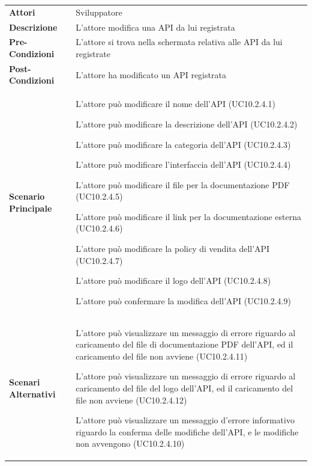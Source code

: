 \begin{minipage}{\linewidth}
	\begin{tabular}{ l | p{11cm}}
		\hline
		\rowcolor{Gray}
		\multicolumn{2}{c}{UC10.2.4 - Modifica API registrata} \\
		\hline
		\textbf{Attori} & Sviluppatore \\
		\textbf{Descrizione} & L'attore modifica una API da lui registrata \\
		\textbf{Pre-Condizioni} & L'attore si trova nella schermata relativa alle API da lui registrate \\
		\textbf{Post-Condizioni} & L'attore ha modificato un API registrata \\
		\textbf{Scenario Principale} & 
		\begin{enumerate*}[label=(\arabic*.),itemjoin={\newline}]
			\item L'attore può modificare il nome dell'API (UC10.2.4.1)
			\item L'attore può modificare la descrizione dell'API (UC10.2.4.2)
			\item L'attore può modificare la categoria dell'API (UC10.2.4.3)
			\item L'attore può modificare l'interfaccia dell'API (UC10.2.4.4)
			\item L'attore può modificare il file per la documentazione PDF (UC10.2.4.5)
			\item L'attore può modificare il link per la documentazione esterna (UC10.2.4.6)
			\item L'attore può modificare la policy di vendita dell'API (UC10.2.4.7)
			\item L'attore può modificare il logo dell'API (UC10.2.4.8)
			\item L'attore può confermare la modifica dell'API (UC10.2.4.9)
		\end{enumerate*}\\
		\textbf{Scenari Alternativi} & 
		\begin{enumerate*}[label=(\arabic*.),itemjoin={\newline}]
			\item L'attore può visualizzare un messaggio di errore riguardo al caricamento del file di documentazione PDF dell'API, ed il caricamento del file non avviene (UC10.2.4.11)
			\item L'attore può visualizzare un messaggio di errore riguardo al caricamento del file del logo dell'API, ed il caricamento del file non avviene (UC10.2.4.12)
			\item L'attore può visualizzare un messaggio d'errore informativo riguardo la conferma delle modifiche dell'API, e le modifiche non avvengono (UC10.2.4.10)
		\end{enumerate*}\\
	\end{tabular}
\end{minipage}

